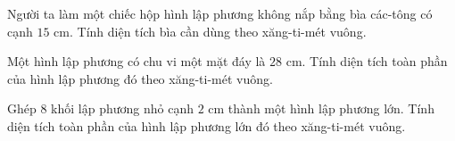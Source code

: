 \begin{ex} %
Người ta làm một chiếc hộp hình lập phương không nắp bằng bìa các-tông có cạnh $15\text{ cm}$. Tính diện tích bìa cần dùng theo xăng-ti-mét vuông.
\end{ex}

\begin{ex} %
Một hình lập phương có chu vi một mặt đáy là $28\text{ cm}$. Tính diện tích toàn phần của hình lập phương đó theo xăng-ti-mét vuông.
\end{ex}

\begin{ex} %
Ghép $8$ khối lập phương nhỏ cạnh $2\text{ cm}$ thành một hình lập phương lớn. Tính diện tích toàn phần của hình lập phương lớn đó theo xăng-ti-mét vuông.
\end{ex}
